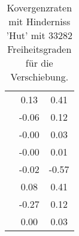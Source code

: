 \begin{table}
\begin{tabular}{c|cc|}
\multicolumn{1}{|c|}{} & \multicolumn{1}{|c|}{      0.13} & \multicolumn{1}{|c|}{      0.41} \\ 
\multicolumn{1}{|c|}{} & \multicolumn{1}{|c|}{     -0.06} & \multicolumn{1}{|c|}{      0.12} \\ 
\multicolumn{1}{|c|}{} & \multicolumn{1}{|c|}{     -0.00} & \multicolumn{1}{|c|}{      0.03} \\ 
\multicolumn{1}{|c|}{} & \multicolumn{1}{|c|}{     -0.00} & \multicolumn{1}{|c|}{      0.01} \\ 
\multicolumn{1}{|c|}{} & \multicolumn{1}{|c|}{     -0.02} & \multicolumn{1}{|c|}{     -0.57} \\ 
\multicolumn{1}{|c|}{} & \multicolumn{1}{|c|}{      0.08} & \multicolumn{1}{|c|}{      0.41} \\ 
\multicolumn{1}{|c|}{} & \multicolumn{1}{|c|}{     -0.27} & \multicolumn{1}{|c|}{      0.12} \\ 
\multicolumn{1}{|c|}{} & \multicolumn{1}{|c|}{      0.00} & \multicolumn{1}{|c|}{      0.03} \\ 
\hline 
\end{tabular}\caption{Kovergenzraten mit Hinderniss 'Hut' mit 33282 Freiheitsgraden für die Verschiebung.}\label{tab:Rate_Hut_level6}
\end{table} 
